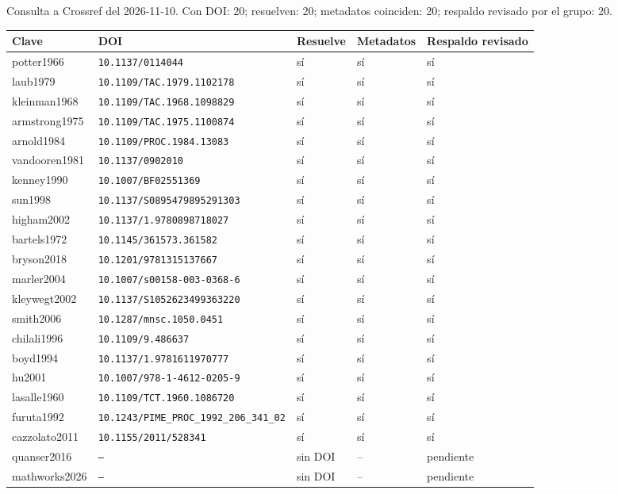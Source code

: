 Consulta a Crossref del 2026-11-10. Con DOI: 20; resuelven: 20; metadatos coinciden: 20; respaldo revisado por el grupo: 20.

{\footnotesize\begin{longtable}{@{}l l l l l@{}}
\toprule
Clave & DOI & Resuelve & Metadatos & Respaldo revisado \\
\midrule\endhead
potter1966 & \texttt{10.1137/0114044} & sí & sí & sí \\
laub1979 & \texttt{10.1109/TAC.1979.1102178} & sí & sí & sí \\
kleinman1968 & \texttt{10.1109/TAC.1968.1098829} & sí & sí & sí \\
armstrong1975 & \texttt{10.1109/TAC.1975.1100874} & sí & sí & sí \\
arnold1984 & \texttt{10.1109/PROC.1984.13083} & sí & sí & sí \\
vandooren1981 & \texttt{10.1137/0902010} & sí & sí & sí \\
kenney1990 & \texttt{10.1007/BF02551369} & sí & sí & sí \\
sun1998 & \texttt{10.1137/S0895479895291303} & sí & sí & sí \\
higham2002 & \texttt{10.1137/1.9780898718027} & sí & sí & sí \\
bartels1972 & \texttt{10.1145/361573.361582} & sí & sí & sí \\
bryson2018 & \texttt{10.1201/9781315137667} & sí & sí & sí \\
marler2004 & \texttt{10.1007/s00158-003-0368-6} & sí & sí & sí \\
kleywegt2002 & \texttt{10.1137/S1052623499363220} & sí & sí & sí \\
smith2006 & \texttt{10.1287/mnsc.1050.0451} & sí & sí & sí \\
chilali1996 & \texttt{10.1109/9.486637} & sí & sí & sí \\
boyd1994 & \texttt{10.1137/1.9781611970777} & sí & sí & sí \\
hu2001 & \texttt{10.1007/978-1-4612-0205-9} & sí & sí & sí \\
lasalle1960 & \texttt{10.1109/TCT.1960.1086720} & sí & sí & sí \\
furuta1992 & \texttt{10.1243/PIME\_PROC\_1992\_206\_341\_02} & sí & sí & sí \\
cazzolato2011 & \texttt{10.1155/2011/528341} & sí & sí & sí \\
quanser2016 & \texttt{--} & sin DOI & -- & pendiente \\
mathworks2026 & \texttt{--} & sin DOI & -- & pendiente \\
\bottomrule
\end{longtable}}
